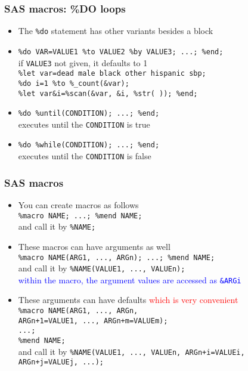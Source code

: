 \documentclass[11pt,pdftex,dvipsnames,usenames,helvetica]{beamer}
\begin{document}
\begin{frame}[fragile]
\frametitle{SAS macros: \%DO loops}
\begin{itemize}
\item The {\tt \%do} statement has other variants besides a block
\item {\tt \%do VAR=VALUE1 \%to VALUE2 \%by VALUE3; ...; \%end;}\\
if {\tt VALUE3} not given, it defaults to 1\\
{\tt \%let var=dead male black other hispanic sbp;}\\
{\tt \%do i=1 \%to \%\_count(\&var);\\ 
\%let var\&i=\%scan(\&var, \&i, \%str( )); \%end;}
\item {\tt \%do \%until(CONDITION); ...; \%end;}\\
  executes until the {\tt CONDITION} is true
\item {\tt \%do \%while(CONDITION); ...; \%end;}\\
  executes until the {\tt CONDITION} is false 
\end{itemize}
\end{frame}

\begin{frame}[fragile]
\frametitle{SAS macros}
\begin{itemize}
\item You can create macros as follows\\
{\tt \%macro NAME; ...; \%mend NAME;}\\
and call it by {\tt \%NAME;}
\item These macros can have arguments as well\\
{\tt \%macro NAME(ARG1, ..., ARGn); ...; \%mend NAME;}\\
and call it by {\tt \%NAME(VALUE1, ..., VALUEn);}\\
\textcolor{blue}{within the macro, the argument values are accessed
as {\tt \&ARGi}}
\item These arguments can have defaults 
\textcolor{red}{which is very convenient}\\
{\tt \%macro NAME(ARG1, ..., ARGn,\\ 
\qquad ARGn+1=VALUE1, ..., ARGn+m=VALUEm);\\
\qquad ...;\\
 \%mend NAME;}\\
and call it by {\tt \%NAME(VALUE1, ..., VALUEn,
ARGn+i=VALUEi, ARGn+j=VALUEj, ...);}\\
\end{itemize}
\end{frame}
\end{document}
